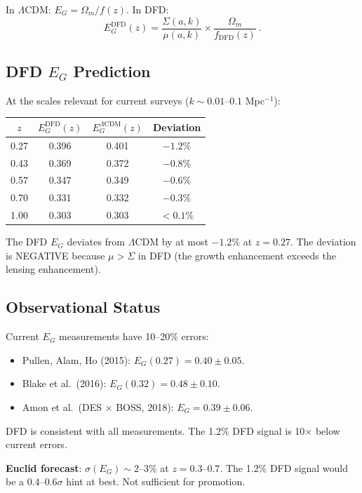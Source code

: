 \documentclass[11pt,a4paper]{article}
\begin{document}
In $\Lambda$CDM: $E_G = \Omega_m/f(z)$. In DFD:
\begin{equation}
E_G^{\mathrm{DFD}}(z) = \frac{\Sigma(a,k)}{\mu(a,k)} \times \frac{\Omega_m}{f_{\mathrm{DFD}}(z)}\,.
\end{equation}

\subsection{DFD $E_G$ Prediction}

At the scales relevant for current surveys ($k \sim 0.01$--$0.1$ Mpc$^{-1}$):

\begin{center}
\begin{longtable}{cccc}
\toprule
$z$ & $E_G^{\mathrm{DFD}}(z)$ & $E_G^{\Lambda\mathrm{CDM}}(z)$ & Deviation \\
\midrule
0.27 & 0.396 & 0.401 & $-1.2\%$ \\
0.43 & 0.369 & 0.372 & $-0.8\%$ \\
0.57 & 0.347 & 0.349 & $-0.6\%$ \\
0.70 & 0.331 & 0.332 & $-0.3\%$ \\
1.00 & 0.303 & 0.303 & $< 0.1\%$ \\
\bottomrule
\end{longtable}
\end{center}

The DFD $E_G$ deviates from $\Lambda$CDM by at most $-1.2\%$ at $z = 0.27$. The deviation is NEGATIVE because $\mu > \Sigma$ in DFD (the growth enhancement exceeds the lensing enhancement).

\subsection{Observational Status}

Current $E_G$ measurements have 10--20\% errors:
\begin{itemize}
\item Pullen, Alam, Ho (2015): $E_G(0.27) = 0.40 \pm 0.05$.
\item Blake et al.\ (2016): $E_G(0.32) = 0.48 \pm 0.10$.
\item Amon et al.\ (DES $\times$ BOSS, 2018): $E_G = 0.39 \pm 0.06$.
\end{itemize}

DFD is consistent with all measurements. The 1.2\% DFD signal is 10$\times$ below current errors.

\textbf{Euclid forecast}: $\sigma(E_G) \sim 2$--$3\%$ at $z = 0.3$--$0.7$. The 1.2\% DFD signal would be a $0.4$--$0.6\sigma$ hint at best. Not sufficient for promotion.
\end{document}
